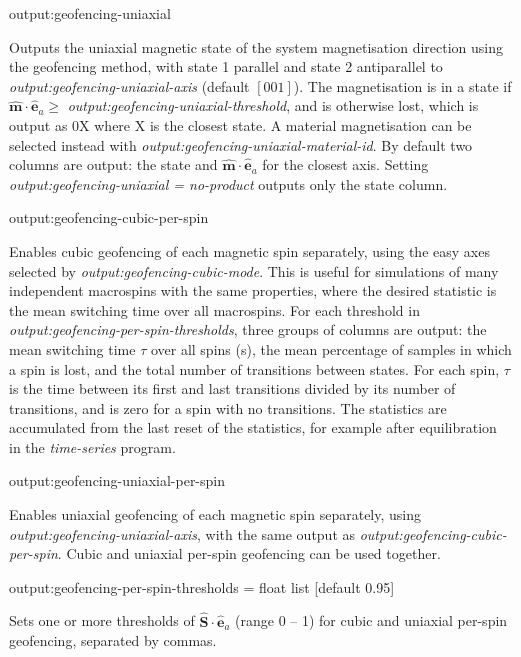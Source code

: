 {\zicf output:geofencing-uniaxial} Outputs the uniaxial magnetic state of the system magnetisation direction using the geofencing method, with state 1 parallel and state 2 antiparallel to \textit{output:geofencing-uniaxial-axis} (default $[001]$). The magnetisation is in a state if $\hat{\mathbf{m}}\cdot\hat{\mathbf{e}}_a \ge$ \textit{output:geofencing-uniaxial-threshold}, and is otherwise lost, which is output as 0X where X is the closest state. A material magnetisation can be selected instead with \textit{output:geofencing-uniaxial-material-id}. By default two columns are output: the state and $\hat{\mathbf{m}}\cdot\hat{\mathbf{e}}_a$ for the closest axis. Setting \textit{output:geofencing-uniaxial = no-product} outputs only the state column.

{\zicf output:geofencing-cubic-per-spin} Enables cubic geofencing of each magnetic spin separately, using the easy axes selected by \textit{output:geofencing-cubic-mode}. This is useful for simulations of many independent macrospins with the same properties, where the desired statistic is the mean switching time over all macrospins. For each threshold in \textit{output:geofencing-per-spin-thresholds}, three groups of columns are output: the mean switching time $\tau$ over all spins (s), the mean percentage of samples in which a spin is lost, and the total number of transitions between states. For each spin, $\tau$ is the time between its first and last transitions divided by its number of transitions, and is zero for a spin with no transitions. The statistics are accumulated from the last reset of the statistics, for example after equilibration in the \textit{time-series} program.

{\zicf output:geofencing-uniaxial-per-spin} Enables uniaxial geofencing of each magnetic spin separately, using \textit{output:geofencing-uniaxial-axis}, with the same output as \textit{output:geofencing-cubic-per-spin}. Cubic and uniaxial per-spin geofencing can be used together.

{\zicf output:geofencing-per-spin-thresholds = float list [default 0.95]} Sets one or more thresholds of $\hat{\mathbf{S}}\cdot\hat{\mathbf{e}}_a$ (range 0 -- 1) for cubic and uniaxial per-spin geofencing, separated by commas.

